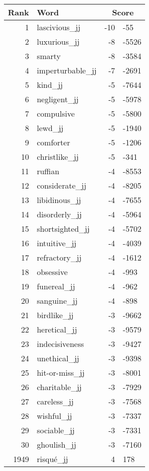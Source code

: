 \begin{longtable}[!htbp]{| rlr@{.}l |}
    \hline
    \textbf{Rank} & \textbf{Word} & \multicolumn{2}{c|}{\textbf{Score}} \\
    \hline
    \endhead
    1 & lascivious\_jj & -10 & -55 \\
    2 & luxurious\_jj & -8 & -5526 \\
    3 & smarty & -8 & -3584 \\
    4 & imperturbable\_jj & -7 & -2691 \\
    5 & kind\_jj & -5 & -7644 \\
    6 & negligent\_jj & -5 & -5978 \\
    7 & compulsive & -5 & -5800 \\
    8 & lewd\_jj & -5 & -1940 \\
    9 & comforter & -5 & -1206 \\
    10 & christlike\_jj & -5 & -341 \\
    11 & ruffian & -4 & -8553 \\
    12 & considerate\_jj & -4 & -8205 \\
    13 & libidinous\_jj & -4 & -7655 \\
    14 & disorderly\_jj & -4 & -5964 \\
    15 & shortsighted\_jj & -4 & -5702 \\
    16 & intuitive\_jj & -4 & -4039 \\
    17 & refractory\_jj & -4 & -1612 \\
    18 & obsessive & -4 & -993 \\
    19 & funereal\_jj & -4 & -962 \\
    20 & sanguine\_jj & -4 & -898 \\
    21 & birdlike\_jj & -3 & -9662 \\
    22 & heretical\_jj & -3 & -9579 \\
    23 & indecisiveness & -3 & -9427 \\
    24 & unethical\_jj & -3 & -9398 \\
    25 & hit-or-miss\_jj & -3 & -8001 \\
    26 & charitable\_jj & -3 & -7929 \\
    27 & careless\_jj & -3 & -7568 \\
    28 & wishful\_jj & -3 & -7337 \\
    29 & sociable\_jj & -3 & -7331 \\
    30 & ghoulish\_jj & -3 & -7160 \\
    1949 & risqué\_jj & 4 & 178 \\

\end{longtable}
